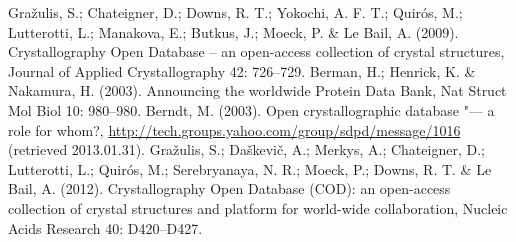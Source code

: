 \documentclass[10pt, a5paper]{article}
\begin{document}
\begin{thebibliography}{9}
 Gražulis, S.; Chateigner, D.; Downs, R. T.; Yokochi, A. F. T.; Quirós, M.; Lutterotti, L.; Manakova, E.; Butkus, J.; Moeck, P. \& Le Bail, A. (2009). Crystallography Open Database – an open-access collection of crystal structures, Journal of Applied Crystallography 42: 726--729.
 Berman, H.; Henrick, K. \& Nakamura, H. (2003). Announcing the worldwide Protein Data Bank, Nat Struct Mol Biol 10: 980--980.
 Berndt, M. (2003). Open crystallographic database "--- a role for whom?, \url{http://tech.groups.yahoo.com/group/sdpd/message/1016} (retrieved 2013.01.31).
 Gražulis, S.; Daškevič, A.; Merkys, A.; Chateigner, D.; Lutterotti, L.; Quirós, M.; Serebryanaya, N. R.; Moeck, P.; Downs, R. T. \& Le Bail, A. (2012). Crystallography Open Database (COD): an open-access collection of crystal structures and platform for world-wide collaboration, Nucleic Acids Research 40: D420--D427.
\end{thebibliography}
\end{document}
